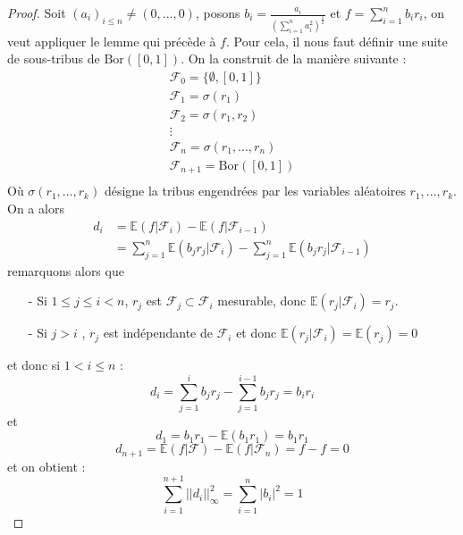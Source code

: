 \documentclass[12pt]{article}
\theoremstyle{definition}
\begin{document}
\begin{proof}
	Soit $(a_i)_{i\leq n}\neq(0,...,0)$, posons $b_i=\frac{a_i}{(\sum_{i=1}^{n}a_i^2)^{\frac{1}{2}}}$ et $f=\sum_{i=1}^{n}b_i r_i$, on veut appliquer le lemme qui précède à $f$. Pour cela, il nous faut définir une suite de sous-tribus de $\text{Bor}([0,1])$. On la construit de la manière suivante :
	\begin{equation*}
		\begin{array}{lll}
		\mathcal{F}_0=\big\{\emptyset,[0,1]\big\}\\
		\mathcal{F}_1=\sigma(r_1)\\
		\mathcal{F}_2=\sigma(r_1,r_2)\\
		\vdots\\
		\mathcal{F}_n=\sigma(r_1,...,r_n)\\
		\mathcal{F}_{n+1}=\text{Bor}([0,1])\\
		\end{array}
	\end{equation*}
	Où $\sigma(r_1,\dots,r_k)$ désigne la tribus engendrées par les variables aléatoires $r_1,\dots,r_k$. On a alors 
	\begin{align*}
		d_i &= \mathbb{E}(f|\mathcal{F}_i)-\mathbb{E}(f|\mathcal{F}_{i-1})\\
		&= \sum_{j=1}^{n}\mathbb{E}(b_jr_j|\mathcal{F}_i)-\sum_{j=1}^{n}\mathbb{E}(b_jr_j|\mathcal{F}_{i-1})
	\end{align*}
	remarquons alors que
	 \begin{enumerate}
		\item[-] Si $1 \leq j\leq i<n$, $r_j$ est $\mathcal{F}_j\subset\mathcal{F}_i$ mesurable, donc $\mathbb{E}(r_j|\mathcal{F}_i)=r_j$.
		\item[-] Si $j> i$ , $r_j$ est indépendante de $\mathcal{F}_i$ et donc $\mathbb{E}(r_j|\mathcal{F}_i)=\mathbb{E}(r_j)=0$
	\end{enumerate}
	et donc si $1< i\leq n$ :
	\begin{equation*}
		d_i =\sum_{j=1}^{i}b_jr_j-\sum_{j=1}^{i-1}b_jr_j= b_ir_i
	\end{equation*}
	et 
	\begin{equation*}
		d_1 = b_1r_1 - \mathbb{E}(b_1r_1)=b_1r_1
	\end{equation*}
	\begin{equation*}
		d_{n+1} = \mathbb{E}(f|\mathcal{F})-\mathbb{E}(f|\mathcal{F}_n)= f-f=0
	\end{equation*}
	et on obtient :
	\begin{equation*}
	\sum_{i=1}^{n+1}||d_i||^2_\infty = \sum_{i=1}^{n}|b_i|^2=1

\end{equation*}
\end{proof}
\end{document}
